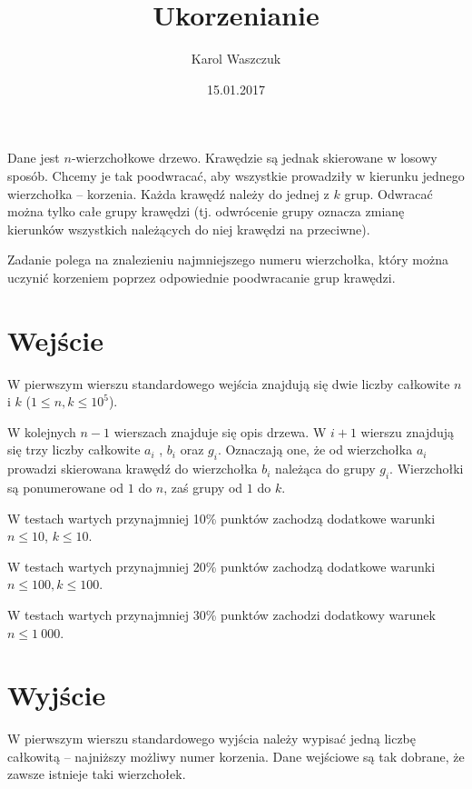 \documentclass[zad,zawodnik,utf8]{sinol}
\title{Ukorzenianie}
\author{Karol Waszczuk} %
\date{15.01.2017}
\begin{document}
\begin{tasktext}%


Dane jest $n$-wierzchołkowe drzewo. Krawędzie są jednak skierowane w losowy sposób. Chcemy je tak poodwracać, aby wszystkie prowadziły w kierunku jednego wierzchołka – korzenia. Każda krawędź należy do jednej z $k$ grup. Odwracać można tylko całe grupy krawędzi (tj. odwrócenie grupy oznacza zmianę kierunków wszystkich należących do niej krawędzi na przeciwne). 

Zadanie polega na znalezieniu najmniejszego numeru wierzchołka, który można uczynić korzeniem poprzez odpowiednie poodwracanie grup krawędzi.

  \section{Wejście}
  
W pierwszym wierszu standardowego wejścia znajdują się dwie liczby całkowite $n$ i $k$ ($1 \leq n, k \leq 10^5$). 

W kolejnych $n - 1$ wierszach znajduje się opis drzewa. W $i + 1$ wierszu znajdują się trzy liczby całkowite $a_i$ , $b_i$ oraz
$g_i$. Oznaczają one, że od wierzchołka $a_i$ prowadzi skierowana krawędź do wierzchołka $b_i$ należąca do grupy $g_i$. Wierzchołki są ponumerowane od $1$ do $n$, zaś grupy od $1$ do $k$.

W testach wartych przynajmniej 10\% punktów zachodzą dodatkowe warunki $n \leq 10$, $k \leq 10$. 

W testach wartych przynajmniej 20\% punktów zachodzą dodatkowe warunki $n \leq 100, k \leq 100$. 

W testach wartych przynajmniej 30\% punktów zachodzi dodatkowy warunek $n \leq 1\ 000$.

\section{Wyjście}
W pierwszym wierszu standardowego wyjścia należy wypisać jedną liczbę całkowitą – najniższy możliwy numer korzenia. Dane wejściowe są tak dobrane, że zawsze istnieje taki wierzchołek.

\makecompactexample
\end{tasktext}
\end{document}

